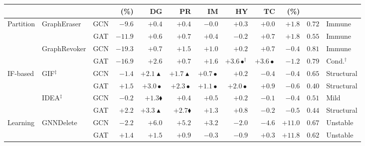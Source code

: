 \begin{table}[t]
\begin{tabular}{@{}llcrrrrrrrcl@{}}
\cmidrule(lr){5-9}
       &        &     & (\%) & DG & PR & IM & HY & TC & (\%) & & \\
\midrule
\multirow{4}{*}{Partition}
 & \multirow{2}{*}{GraphEraser}  & GCN & $-9.6$  & $\mathbf{+0.4}$         & $+0.4$               & $-0.0$               & $+0.3$               & $+0.0$                       & $+1.8$  & $0.72$ & Immune \\
 &                               & GAT & $-11.9$ & $+0.6$                  & $+0.7$               & $+0.4$               & $-0.2$               & $\mathbf{+0.7}$              & $+1.8$  & $0.55$ & Immune \\
 & \multirow{2}{*}{GraphRevoker} & GCN & $-19.3$ & $+0.7$                  & $\mathbf{+1.5}$      & $+1.0$               & $+0.2$               & $+0.7$                       & $-0.4$  & $0.81$ & Immune \\
 &                               & GAT & $-16.9$ & $+2.6$                  & $+0.7$               & $+1.6$               & $\mathbf{+3.6}\bullet^{\dagger}$ & $+3.6\bullet$        & $-1.2$  & $0.79$ & Cond.$^{\dagger}$ \\
\midrule
\multirow{4}{*}{IF-based}
 & \multirow{2}{*}{GIF$^{\ddagger}$}  & GCN & $-1.4$ & $\mathbf{+2.1}\blacktriangle$ & $+1.7\blacktriangle$ & $+0.7\bullet$        & $+0.2$               & $-0.4$                       & $-0.4$  & $0.65$ & Structural \\
 &                                    & GAT & $+1.5$ & $\mathbf{+3.0}\bullet$  & $+2.3\bullet$        & $+1.1\bullet$        & $+2.0\bullet$        & $+0.9$                       & $-0.6$  & $0.40$ & Structural \\
 & \multirow{2}{*}{IDEA$^{\ddagger}$} & GCN & $-0.2$ & $\mathbf{+1.3}\blacklozenge$ & $+0.4$               & $+0.5$               & $+0.2$               & $-0.1$                       & $-0.4$  & $0.51$ & Mild \\
 &                                    & GAT & $+2.2$ & $\mathbf{+3.3}\blacktriangle$ & $+2.7\blacklozenge$  & $+1.3$               & $+0.8$               & $-0.2$                       & $-0.5$  & $0.44$ & Structural \\
\midrule
\multirow{4}{*}{Learning}
 & \multirow{2}{*}{GNNDelete}    & GCN & $-2.2$ & $\mathbf{+6.0}$         & $+5.2$               & $+3.2$               & $-2.0$               & $-4.6$                       & $+11.0$ & $0.67$ & Unstable \\
 &                               & GAT & $+1.4$ & $\mathbf{+1.5}$         & $+0.9$               & $-0.3$               & $-0.9$               & $+0.3$                       & $+11.8$ & $0.62$ & Unstable \\

\end{tabular}
\end{table}
